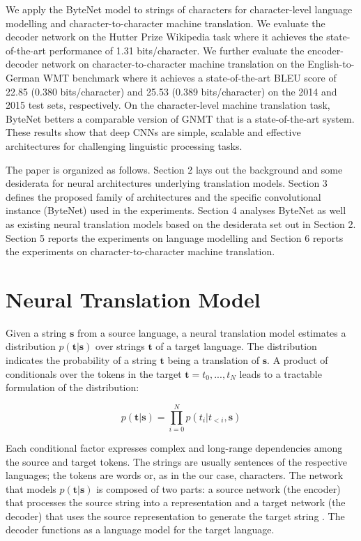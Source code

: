 We apply the ByteNet model to strings of characters for character-level language modelling and character-to-character machine translation. We evaluate the decoder network on the Hutter Prize Wikipedia task \citep{hutterprize} where it achieves the state-of-the-art performance of 1.31 bits/character. We further evaluate the encoder-decoder network on character-to-character machine translation on the English-to-German WMT benchmark where it achieves a state-of-the-art BLEU score of 22.85 (0.380 bits/character) and 25.53 (0.389 bits/character) on the 2014 and 2015 test sets, respectively. On the character-level machine translation task, ByteNet betters a comparable version of GNMT \citep{wu2016} that is a state-of-the-art system. These results show that deep CNNs are simple, scalable and effective architectures for challenging linguistic processing tasks.

The paper is organized as follows. Section 2 lays out the background and some desiderata for neural architectures underlying translation models. Section 3 defines the proposed family of architectures and the specific convolutional instance (ByteNet) used in the experiments. Section 4 analyses ByteNet as well as existing neural translation models based on the desiderata set out in Section 2. Section 5 reports the experiments on language modelling and Section 6 reports the experiments on character-to-character machine translation.

\section{Neural Translation Model}
\label{NTM}
Given a string $\mathbf{s}$ from a source language, a neural translation model estimates a distribution $p(\mathbf{t}|\mathbf{s})$ over strings $\mathbf{t}$ of a target language. The distribution indicates the probability of a string $\mathbf{t}$ being a translation of $\mathbf{s}$. A product of conditionals over the tokens in the target $\mathbf{t} = t_0,...,t_N$ leads to a tractable formulation of the distribution:

\begin{equation}
p(\mathbf{t} | \mathbf{s}) = \prod_{i=0}^{N}p(t_{i} | t_{<i},\mathbf{s})
\label{eq:likelihood}
\end{equation}

Each conditional factor expresses complex and long-range dependencies among the source and target tokens. The strings are usually sentences of the respective languages; the tokens are words or, as in the our case, characters. The network that models $p(\mathbf{t}|\mathbf{s})$ is composed of two parts: a source network (the encoder) that processes the source string into a representation and a target network (the decoder) that uses the source representation to generate the target string \citep{kalchbrenner13emnlp}. The decoder  functions as a language model for the target language.

